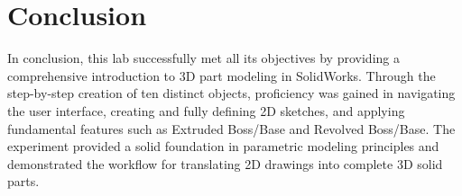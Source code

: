 \section{Conclusion}

In conclusion, this lab successfully met all its objectives by providing a comprehensive introduction to 3D part modeling in SolidWorks. Through the step-by-step creation of ten distinct objects, proficiency was gained in navigating the user interface, creating and fully defining 2D sketches, and applying fundamental features such as Extruded Boss/Base and Revolved Boss/Base. The experiment provided a solid foundation in parametric modeling principles and demonstrated the workflow for translating 2D drawings into complete 3D solid parts.
